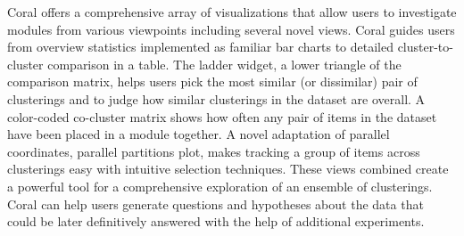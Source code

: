 \documentclass[12pt]{cmuthesis}
\newcommand\Coral{Coral\xspace}
\begin{document}
  \Coral offers a comprehensive array of visualizations that allow users to investigate modules from various viewpoints including several novel views. \Coral guides users from overview statistics implemented as familiar bar charts to detailed cluster-to-cluster comparison in a table. The ladder widget, a lower triangle of the comparison matrix, helps users pick the most similar (or dissimilar) pair of clusterings and to judge how similar clusterings in the dataset are overall. A color-coded co-cluster matrix shows how often any pair of items in the dataset have been placed in a module together. A novel adaptation of parallel coordinates, parallel partitions plot, makes tracking a group of items across clusterings easy with intuitive selection techniques. These views combined create a powerful tool for a comprehensive exploration of an ensemble of clusterings. \Coral can help users generate questions and hypotheses about the data that could be later definitively answered with the help of additional experiments.







\end{document}
